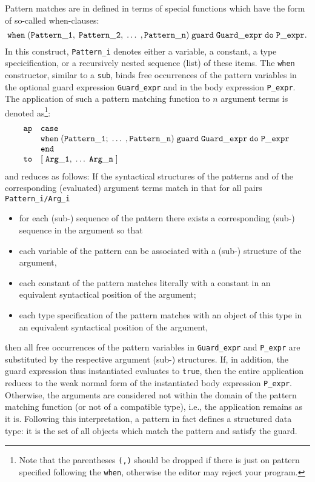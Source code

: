 Pattern matches are in \kir defined in terms of special functions which have the form of
so-called {\sc when}-{\mys clauses}:
$$
{\tt when\;( Pattern\_1,\;Pattern\_2,\;\ldots\;,Pattern\_n)\;guard\;Guard\_expr\;do\;P\_expr}.
$$
In this construct, {\tt Pattern\_i} denotes either a variable, a constant, a type specicification,
or a recursively nested sequence (list) of these items. The {\tt when} constructor, similar to
a {\tt sub}, binds free occurrences of the pattern variables in the
 optional {\mys guard expression}
 {\tt Guard\_expr} 
and in the {\mys body expression} {\tt P\_expr}. The application of such a pattern matching
function to $n$ argument terms is denoted as\footnote{Note that the parentheses {\tt (,)}
should be dropped if there is just on pattern specified following the {\tt when}, otherwise
the editor may reject your program.}:
$$
\begin{array}{ll}
{\tt ap}&{\tt case}\;
\\  & {\tt when\;(Pattern\_1;\;\ldots\;,Pattern\_n)\;guard\;Guard\_expr\;do\;P\_expr}\;
\\ & {\tt end}
\\ {\tt to}& {\tt [\;Arg\_1, \;\ldots\;Arg\_n\;]}
\end{array}
$$
and reduces as follows: If the syntactical structures of the patterns and of the corresponding
(evaluated) argument terms match in that for all pairs {\tt Pattern\_i/Arg\_i}
\begin{itemize}
\item for each (sub-) sequence of the pattern there exists a corresponding (sub-) sequence in
the argument so that
\item each variable of the pattern can be associated with a (sub-) structure of the argument,
\item each constant of the pattern matches literally with a constant in an equivalent
syntactical position of the argument;
\item each type specification of the pattern matches with an object of this type in an
equivalent syntactical position of the argument,
\end{itemize}
then all free occurrences of the pattern variables in {\tt Guard\_expr} and {\tt P\_expr}
are substituted by the respective argument (sub-) structures. If, in addition, the guard 
expression thus instantiated evaluates to {\tt true}, then the entire application
reduces to the {\mys weak normal form} of the instantiated body expression {\tt P\_expr}.
Otherwise, the arguments are considered not within the domain of the pattern matching
function (or not of a compatible type), i.e., the application remains as it is. Following this
interpretation, a pattern in fact defines a {\mys structured data type}: it is the set of all
objects which match the pattern and satisfy the guard.

